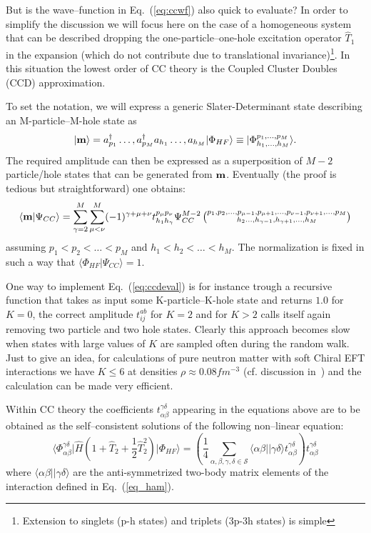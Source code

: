 But is the wave--function in Eq.~(\eqref{eq:ccwf}) also quick to evaluate?
In order to simplify the discussion we will focus here on the case of a homogeneous system 
that can be described dropping the one-particle--one-hole excitation operator $\hat{T}_1$ in 
the expansion (which do not contribute due to translational invariance)\footnote{Extension to singlets (p-h states) and triplets (3p-3h states) is simple}. 
In this situation the lowest order of CC theory is the Coupled Cluster Doubles (CCD) approximation.

To set the notation, we will express a generic Slater-Determinant state describing an M-particle--M-hole state as
\begin{equation}
\rvert {\bf m}\rangle= a^\dagger_{p_1}\dots,a^\dagger_{p_M}a_{h_1}\dots,a_{h_M} \vert \Phi_{HF} \rangle \equiv \; \rvert \Phi^{p_1,\dots,p_M}_{h_1,\dots,h_M} \rangle.
\end{equation}
The required amplitude can then be expressed as a superposition of $M-2$ particle/hole states
that can be generated from ${\bf m}$. Eventually (the proof is tedious but straightforward) one obtains:
\begin{equation}
\label{eq:ccdeval}
\langle {\bf m}\vert \Psi_{CC}\rangle = \sum_{\gamma=2}^M\sum_{\mu<\nu}^M (-1)^{\gamma+\mu+\nu}t^{p_\mu p_\nu}_{h_1 h_\gamma}\Psi_{CC}^{M-2}\left(\substack{p_1,p_2,\dots,p_{\mu-1},p_{\mu+1},\dots,p_{\nu-1},p_{\nu+1},\dots,p_M\\ h_2\dots,h_{\gamma-1},h_{\gamma+1},\dots,h_M}\right)
\end{equation}
assuming $p_1<p_2<\dots<p_M$ and $h_1<h_2<\dots<h_M$. The normalization is fixed in such a way that $\langle \Phi_{HF}\vert \Psi_{CC}\rangle = 1$.

One way to implement Eq.~(\eqref{eq:ccdeval}) is for instance trough a recursive function that takes as input some K-particle--K-hole state and 
returns $1.0$ for $K=0$, the correct amplitude $t_{ij}^{ab}$ for $K=2$ and for $K>2$ calls itself again removing two particle and two hole states.
Clearly this approach becomes slow when states with large values of $K$ are sampled often during the random walk. Just to give an idea, for
calculations of pure neutron matter with soft Chiral EFT interactions we have $K\leq6$ at densities $\rho\approx0.08 fm^{-3}$ (cf. discussion in~\cite{Rrapaj16})
and the calculation can be made very efficient.

Within CC theory the coefficients $t_{\alpha\beta}^{\gamma\delta}$ appearing in the equations above are to be obtained as the self--consistent solutions
of the following non--linear equation:
\begin{equation}
\label{eq_CCD}
\langle \Phi^{\gamma\delta}_{\alpha\beta} \lvert \hat{H} \left( 1+\hat{T}_2+\frac{1}{2}\hat{T}^2_2\right) \rvert\Phi_{HF} \rangle= \left( \frac{1}{4}\sum_{\alpha,\beta,\gamma,\delta \in \mathcal{S}} \langle \alpha\beta\lvert\rvert \gamma\delta\rangle t_{\alpha\beta}^{\gamma\delta}\right) t_{\alpha\beta}^{\gamma\delta}
\end{equation}
where $\langle \alpha\beta\lvert\rvert \gamma\delta\rangle$ are the anti-symmetrized two-body matrix elements of the interaction defined in Eq.~(\eqref{eq_ham}).

